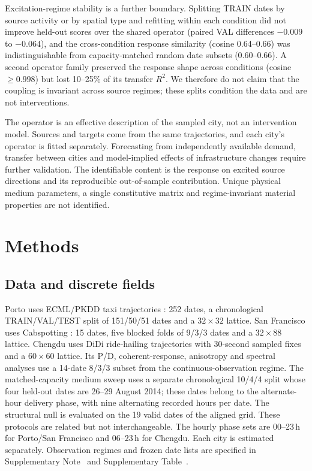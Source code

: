 \documentclass[11pt]{article}
\begin{document}
Excitation-regime stability is a further boundary. Splitting TRAIN dates by source activity or by spatial type and refitting within each condition did not improve held-out scores over the shared operator (paired VAL differences $-0.009$ to $-0.064$), and the cross-condition response similarity (cosine 0.64--0.66) was indistinguishable from capacity-matched random date subsets (0.60--0.66). A second operator family preserved the response shape across conditions (cosine $\geq 0.998$) but lost 10--25\% of its transfer $R^2$. We therefore do not claim that the coupling is invariant across source regimes; these splits condition the data and are not interventions.

The operator is an effective description of the sampled city, not an intervention model. Sources and targets come from the same trajectories, and each city's operator is fitted separately. Forecasting from independently available demand, transfer between cities and model-implied effects of infrastructure changes require further validation. The identifiable content is the response on excited source directions and its reproducible out-of-sample contribution. Unique physical medium parameters, a single constitutive matrix and regime-invariant material properties are not identified.

\section{Methods}\label{sec:methods}
\subsection{Data and discrete fields}\label{sec:d-data}

Porto uses ECML/PKDD taxi trajectories \cite{ucitaxi2015}: 252 dates, a chronological TRAIN/VAL/TEST split of 151/50/51 dates and a $32\times32$ lattice. San Francisco uses Cabspotting \cite{cabspotting2009}: 15 dates, five blocked folds of 9/3/3 dates and a $32\times88$ lattice. Chengdu uses DiDi ride-hailing trajectories \cite{didi2014chengdu} with 30-second sampled fixes and a $60\times60$ lattice. Its P/D, coherent-response, anisotropy and spectral analyses use a 14-date 8/3/3 subset from the continuous-observation regime. The matched-capacity medium sweep uses a separate chronological 10/4/4 split whose four held-out dates are 26--29 August 2014; these dates belong to the alternate-hour delivery phase, with nine alternating recorded hours per date. The structural null is evaluated on the 19 valid dates of the aligned grid. These protocols are related but not interchangeable. The hourly phase sets are 00--23\,h for Porto/San Francisco and 06--23\,h for Chengdu. Each city is estimated separately. Observation regimes and frozen date lists are specified in Supplementary Note~ and Supplementary Table~.
\end{document}
